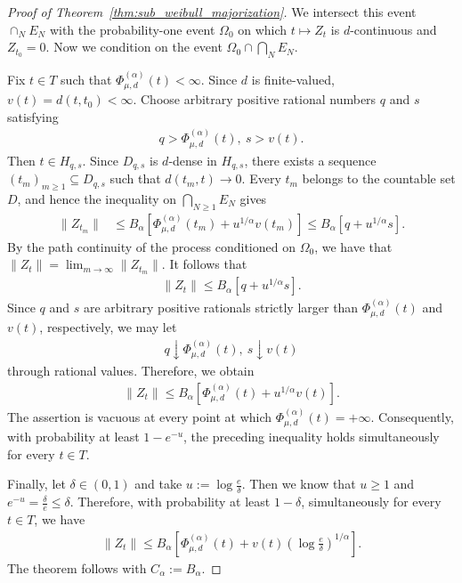\documentclass[11pt]{article}
\begin{document}
\begin{proof}[Proof of Theorem~\ref{thm:sub_weibull_majorization}]
We intersect this event $\cap_{N}E_N$ with the probability-one event $\Omega_0$ on which
$t\mapsto Z_t$ is $d$-continuous and $Z_{t_0}=0$. Now we condition on the event $\Omega_0\cap\bigcap_{N}E_N$.

Fix $t\in T$ such that $\Phi_{\mu,d}^{(\alpha)}(t)<\infty$.
Since $d$ is finite-valued, $v(t)=d(t,t_0)<\infty$. Choose arbitrary
positive rational numbers $q$ and $s$ satisfying
\begin{align*}
q>\Phi_{\mu,d}^{(\alpha)}(t),
\ 
s>v(t).
\end{align*}
Then $t\in H_{q,s}$. Since $D_{q,s}$ is $d$-dense in $H_{q,s}$,
there exists a sequence $(t_m)_{m\ge1}\subseteq D_{q,s}$ such that
$d(t_m,t)\rightarrow0$. Every $t_m$ belongs to the countable set $D$, and hence the inequality
on $\bigcap_{N\ge1}E_N$ gives
\begin{align*}
\|Z_{t_m}\|
&\le
B_\alpha
\left[
\Phi_{\mu,d}^{(\alpha)}(t_m)
+u^{1/\alpha}v(t_m)
\right]\le
B_\alpha
\left[
q+u^{1/\alpha}s
\right].
\end{align*}
By the path continuity of the process conditioned on $\Omega_0$, we have that $\|Z_t\|
=
\lim_{m\to\infty}\|Z_{t_m}\|$.
It follows that
\begin{align*}
\|Z_t\|
\le
B_\alpha
\left[
q+u^{1/\alpha}s
\right].
\end{align*}
Since $q$ and $s$ are arbitrary positive rationals strictly larger than
$\Phi_{\mu,d}^{(\alpha)}(t)$ and $v(t)$, respectively, we may let
\begin{align*}
q\downarrow\Phi_{\mu,d}^{(\alpha)}(t),
\ 
s\downarrow v(t)
\end{align*}
through rational values. Therefore, we obtain
\begin{align*}
\|Z_t\|
\le
B_\alpha
\left[
\Phi_{\mu,d}^{(\alpha)}(t)
+u^{1/\alpha}v(t)
\right].
\end{align*}
The assertion is vacuous at every point at which
$\Phi_{\mu,d}^{(\alpha)}(t)=+\infty$. Consequently, with probability
at least $1-e^{-u}$, the preceding inequality holds simultaneously for
every $t\in T$.

Finally, let $\delta\in(0,1)$ and take $u:=\log\frac{e}{\delta}$.
Then we know that $u\ge1$ and $e^{-u}=\frac{\delta}{e}\le\delta$.
Therefore, with probability at least $1-\delta$, simultaneously for
every $t\in T$, we have
\begin{align*}
\|Z_t\|
\le
B_\alpha
\left[
\Phi_{\mu,d}^{(\alpha)}(t)
+v(t)
\left(
\log\frac{e}{\delta}
\right)^{1/\alpha}
\right].
\end{align*}
The theorem follows with $C_\alpha:=B_\alpha$.
\end{proof}
\fi
\end{document}
